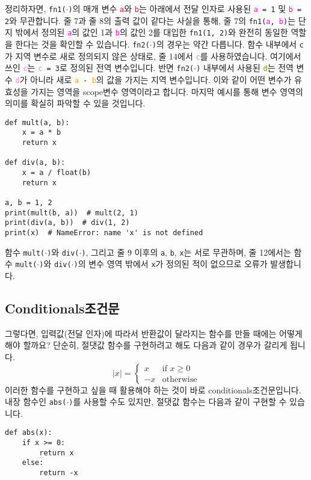 \documentclass[../main.tex]{subfiles}
\begin{document}
정리하자면, \texttt{fn1($\cdot$)}의 매개 변수 \texttt{\textcolor{red}{a}}와
\texttt{\textcolor{red}{b}}는 아래에서 전달 인자로 사용된
\texttt{\textcolor{magenta}{a} = 1} 및 \texttt{\textcolor{magenta}{b} = 2}와
무관합니다.  줄 7과 줄 8의 출력 값이 같다는 사실을 통해, 줄 7의
\texttt{fn1(\textcolor{magenta}{a}, \textcolor{magenta}{b})}는 단지 밖에서
정의된 \texttt{\textcolor{magenta}{a}}의 값인 1과
\texttt{\textcolor{magenta}{b}}의 값인 2를 대입한 \texttt{fn1(1, 2)}와 완전히
동일한 역할을 한다는 것을 확인할 수 있습니다.  \texttt{fn2($\cdot$)}의 경우는
약간 다릅니다.  함수 내부에서 \texttt{c}가 지역 변수로 새로 정의되지 않은
상태로, 줄 14에서 \texttt{\textcolor{violet}{c}}를 사용하였습니다.  여기에서
쓰인 \texttt{\textcolor{violet}{c}}는 \texttt{\textcolor{violet}{c} = 3}로
정의된 전역 변수입니다.  반면 \texttt{fn2($\cdot$)} 내부에서 사용된
\texttt{\textcolor{olive}{d}}는 전역 변수 \texttt{\textcolor{violet}{d}}가
아니라 새로 \texttt{\textcolor{orange}{a} - \textcolor{orange}{b}}의 값을
가지는 지역 변수입니다.  이와 같이 어떤 변수가 유효성을 가지는 영역을 scope변수
영역이라고 합니다.  마지막 예시를 통해 변수 영역의 의미를 확실히 파악할 수 있을
것입니다.
\begin{verbatim}
def mult(a, b):
    x = a * b
    return x

def div(a, b):
    x = a / float(b)
    return x

a, b = 1, 2
print(mult(b, a))  # mult(2, 1)
print(div(a, b))  # div(1, 2)
print(x)  # NameError: name 'x' is not defined
\end{verbatim}
함수 \texttt{mult($\cdot$)}와 \texttt{div($\cdot$)}, 그리고 줄 9 이후의 \texttt{a}, \texttt{b}, \texttt{x}는 서로 무관하며, 줄 12에서는 함수 \texttt{mult($\cdot$)}와 \texttt{div($\cdot$)}의 변수 영역 밖에서 \texttt{x}가 정의된 적이 없으므로 오류가 발생합니다.

\subsection{Conditionals조건문}
그렇다면, 입력값(전달 인자)에 따라서 반환값이 달라지는 함수를 만들 때에는 어떻게 해야 할까요?
단순히, 절댓값 함수를 구현하려고 해도 다음과 같이 경우가 갈리게 됩니다.
$$
|x| = \begin{cases}
x & \text{if $x \geq 0$}\\
-x & \text{otherwise}
\end{cases}
$$
이러한 함수를 구현하고 싶을 때 활용해야 하는 것이 바로 conditionals조건문입니다.
내장 함수인 \texttt{abs($\cdot$)}를 사용할 수도 있지만, 절댓값 함수는 다음과
같이 구현할 수 있습니다.
\begin{verbatim}
def abs(x):
    if x >= 0:
        return x
    else:
        return -x
\end{verbatim}
\end{document}
